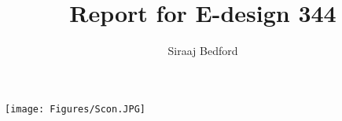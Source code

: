 \documentclass[masters-a,                       %
               12pt,oneside,openany,a4paper, %
               a5block,                      %
              afrikaans ,english,           %
               ]{usthesis}
\title{Report for E-design 344}
\author{Siraaj Bedford}
       {Siraaj Bedford\\
           21093741}
\begin{document}
\frontmatter%

\TitlePage
\begin{center}
    \texttt{[image: Figures/Scon.JPG]}
    \centering
\end{center}

\tableofcontents
\listoffigures
\listoftables


\mainmatter%








\appendix%


\backmatter%


\renewcommand{\thesection}{A.\arabic{section}}
\renewcommand{\thechapter}{A.}
\begin{appendix}




\end{appendix}
\end{document}

